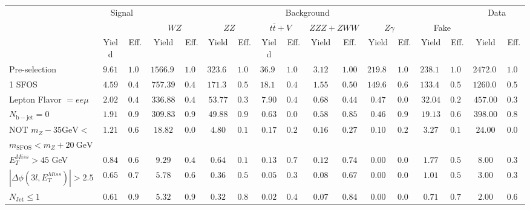\begin{tabular}{l||c|c||c|c||c|c||c|c||c|c||c|c||c|c||c|c}
\hline
 &                 \multicolumn{2}{c||}{Signal}            &  \multicolumn{12}{c||}{Background} &  \multicolumn{2}{c}{Data} \\
 & &  & \multicolumn{2}{c||}{$WZ$} & \multicolumn{2}{c||}{$ZZ$} & \multicolumn{2}{c||}{$t\bar{t}+V$} & \multicolumn{2}{c||}{$ZZZ+ZWW$} & \multicolumn{2}{c||}{$Z\gamma$} & \multicolumn{2}{c||}{Fake} &  & \\ 
 & Yield & Eff. & Yield & Eff. & Yield & Eff. & Yield & Eff. & Yield & Eff. & Yield & Eff. & Yield & Eff. & Yield & Eff.\\
\hline\hline
Pre-selection &  $9.61$ &  $1.00$ &  $1566.90$ &  $1.00$ &  $323.60$ &  $1.00$ &  $36.93$ &  $1.00$ &  $3.12$ &  $1.00$ &  $219.80$ &  $1.00$ &  $238.12$ &  $1.00$ &  $2472.00$ &  $1.00$\\ 
\hline
1 SFOS &  $4.59$ &  $0.48$ &  $757.39$ &  $0.48$ &  $171.38$ &  $0.53$ &  $18.10$ &  $0.49$ &  $1.55$ &  $0.50$ &  $149.60$ &  $0.68$ &  $133.47$ &  $0.56$ &  $1260.00$ &  $0.51$\\ 
\hline
Lepton Flavor $= ee\mu$ &  $2.02$ &  $0.44$ &  $336.88$ &  $0.44$ &  $53.77$ &  $0.31$ &  $7.90$ &  $0.44$ &  $0.68$ &  $0.44$ &  $0.47$ &  $0.00$ &  $32.04$ &  $0.24$ &  $457.00$ &  $0.36$\\ 
\hline
$N_{\mathrm{b-jet}} = 0$ &  $1.91$ &  $0.94$ &  $309.83$ &  $0.92$ &  $49.88$ &  $0.93$ &  $0.63$ &  $0.08$ &  $0.58$ &  $0.85$ &  $0.46$ &  $0.99$ &  $19.13$ &  $0.60$ &  $398.00$ &  $0.87$\\ 
\hline
NOT $m_Z - 35 \mathrm{GeV} <$   & \multirow{2}{*}{$1.21$} &  \multirow{2}{*}{$0.64$} &  \multirow{2}{*}{$18.82$} &  \multirow{2}{*}{$0.06$} &  \multirow{2}{*}{$4.80$} &  \multirow{2}{*}{$0.10$} &  \multirow{2}{*}{$0.17$} &  \multirow{2}{*}{$0.27$} &  \multirow{2}{*}{$0.16$} &  \multirow{2}{*}{$0.27$} &  \multirow{2}{*}{$0.10$} &  \multirow{2}{*}{$0.21$} &  \multirow{2}{*}{$3.27$} &  \multirow{2}{*}{$0.17$} &  \multirow{2}{*}{$24.00$} &  \multirow{2}{*}{$0.06$}\\ 
$ m_{\mathrm{SFOS}} < m_Z + 20~\mathrm{GeV}$  & & & & & & & & & & & & & &  & \\
\hline
$E_{T}^{Miss} > 45$ GeV &  $0.84$ &  $0.69$ &  $9.29$ &  $0.49$ &  $0.64$ &  $0.13$ &  $0.13$ &  $0.79$ &  $0.12$ &  $0.74$ &  $0.00$ &  $0.00$ &  $1.77$ &  $0.54$ &  $8.00$ &  $0.33$\\ 
\hline
$|\Delta\phi(3l,E_{T}^{Miss})| > 2.5$ &  $0.65$ &  $0.77$ &  $5.78$ &  $0.62$ &  $0.36$ &  $0.57$ &  $0.05$ &  $0.39$ &  $0.08$ &  $0.67$ &  $0.00$ &  $0.00$ &  $1.01$ &  $0.57$ &  $3.00$ &  $0.38$\\ 
\hline
$N_{\mathrm{Jet}} \leq 1$ &  $0.61$ &  $0.94$ &  $5.32$ &  $0.92$ &  $0.32$ &  $0.89$ &  $0.02$ &  $0.40$ &  $0.07$ &  $0.84$ &  $0.00$ &  $0.00$ &  $0.71$ &  $0.70$ &  $2.00$ &  $0.67$\\ 
\hline
\end{tabular}
